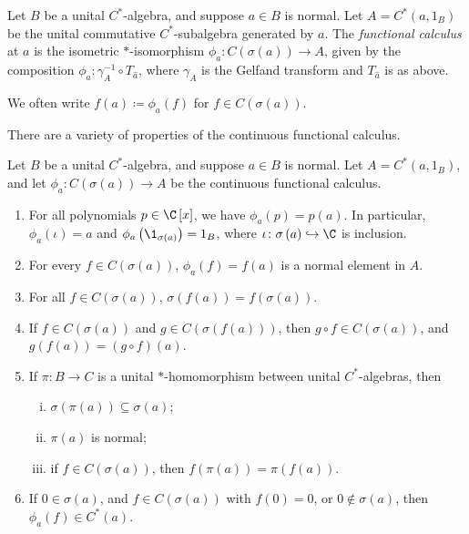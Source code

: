 \begin{definition}
  Let $B$ be a unital $C^{\ast}$-algebra, and suppose $a\in B$ is normal. Let $A = C^{\ast}\left( a,1_B \right)$ be the unital commutative $C^{\ast}$-subalgebra generated by $a$. The \textit{functional calculus} at $a$ is the isometric $\ast$-isomorphism $\phi_a\colon C\left( \sigma\left( a \right) \right)\rightarrow A$, given by the composition $\phi_a\colon \gamma_{A}^{-1}\circ T_{\hat{a}}$, where $\gamma_A$ is the Gelfand transform and $T_{\hat{a}}$ is as above.\newline
  
  We often write $f(a) \coloneq \phi_a(f)$ for $f\in C\left( \sigma\left( a \right) \right)$.
\end{definition}
There are a variety of properties of the continuous functional calculus.
\begin{theorem}\label{thm:continuous_functional_calculus}
  Let $B$ be a unital $C^{\ast}$-algebra, and suppose $a\in B$ is normal. Let $A = C^{\ast}\left( a,1_B \right)$, and let $\phi_a\colon C\left( \sigma\left( a \right) \right)\rightarrow A$ be the continuous functional calculus.
  \begin{enumerate}[(1)]
    \item For all polynomials $p\in \C\left[ x \right]$, we have $\phi_a(p) = p(a)$. In particular, $\phi_a(\iota) = a$ and $\phi_a\left( \1_{\sigma(a)} \right) = 1_B$, where $\iota\colon \sigma\left( a \right)\hookrightarrow \C$ is inclusion.
    \item For every $f\in C\left( \sigma\left( a \right) \right)$, $\phi_a(f) = f(a)$ is a normal element in $A$.
    \item For all $f\in C\left( \sigma\left( a \right) \right)$, $\sigma\left( f(a) \right) = f\left( \sigma\left( a \right) \right)$.
    \item If $f\in C\left( \sigma\left( a \right) \right)$ and $g\in C\left( \sigma\left( f(a) \right) \right)$, then $g\circ f\in C\left( \sigma\left( a \right) \right)$, and $g(f(a)) = \left( g\circ f \right)\left( a \right)$.
    \item If $\pi\colon B\rightarrow C$ is a unital $\ast$-homomorphism between unital $C^{\ast}$-algebras, then
      \begin{enumerate}[(i)]
        \item $\sigma\left( \pi\left( a \right) \right)\subseteq \sigma\left( a \right)$;
        \item $\pi(a)$ is normal;
        \item if $f\in C\left( \sigma\left( a \right) \right)$, then $f\left( \pi\left( a \right) \right) = \pi\left( f\left( a \right) \right)$.
      \end{enumerate}
    \item If $0\in\sigma\left( a \right)$, and $f\in C\left( \sigma\left( a \right) \right)$ with $f(0) = 0$, or $0\notin \sigma\left( a \right)$, then $\phi_a\left( f \right) \in C^{\ast}\left( a \right)$.
  \end{enumerate}
\end{theorem}
